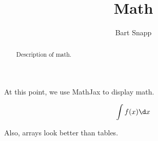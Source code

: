 \documentclass{ximera}
\title{Math}
\author{Bart Snapp}
\begin{document}
\begin{abstract}
  Description of math.
\end{abstract}
\maketitle

At this point, we use MathJax to display math.

\[
\int f(x) \d x
\]


Also, arrays look better than tables.
\end{document}
